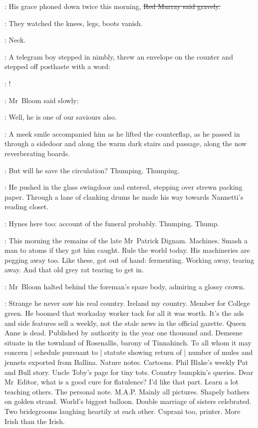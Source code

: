 
\redmurray:
His grace phoned down twice this morning,
\sout{Red Murray said gravely.}

:
They watched the knees, legs, boots vanish.

\BloomInt:
Neck.

:
A telegram boy stepped in nimbly,
threw an envelope on the counter
and stepped off posthaste with a word:

\boy:
!

:
Mr~Bloom said slowly:

\Bloom:
Well, he is one of our saviours also.

:
A meek smile accompanied him
as he lifted the counterflap,
as he passed in through a sidedoor
and along the warm dark stairs and passage,
along the now reverberating boards.

\BloomInt:
But will he save the circulation?
Thumping.
Thumping.

:
He pushed in the glass swingdoor and entered,
stepping over strewn packing paper.
Through a lane of clanking drums
he made his way towards Nannetti's reading closet.

\BloomInt:
Hynes here too:
account of the funeral probably.
Thumping.
Thump.



\BloomInt:
This morning the remains of the late Mr~Patrick Dignam.
Machines.
Smash a man to atoms if they got him caught.
Rule the world today.
His machineries are pegging away too.
Like these, got out of hand:
fermenting.
Working away, tearing away.
And that old grey rat tearing to get in.



:
Mr~Bloom halted behind the foreman's spare body,
admiring a glossy crown.

\BloomInt:
Strange he never saw his real country.
Ireland my country.
Member for College green.
He boomed that workaday worker tack for all it was worth.
It's the ads and side features sell a weekly,
not the stale news in the official gazette.
Queen Anne is dead.
Published by authority in the year one thousand and.
Demesne situate in the townland of Rosenallis,
barony of Tinnahinch.
To all whom it may concern |
schedule pursuant to |
statute showing return of |
number of mules and jennets exported from Ballina.
Nature notes.
Cartoons.
Phil Blake's weekly Pat and Bull story.
Uncle Toby's page for tiny tots.
Country bumpkin's queries.
Dear Mr~Editor, what is a good cure for flatulence?
I'd like that part.
Learn a lot teaching others.
The personal note.
M.A.P. Mainly all pictures.
Shapely bathers on golden strand.
World's biggest balloon.
Double marriage of sisters celebrated.
Two bridegrooms laughing heartily at each other.
Cuprani too, printer.
More Irish than the Irish.

